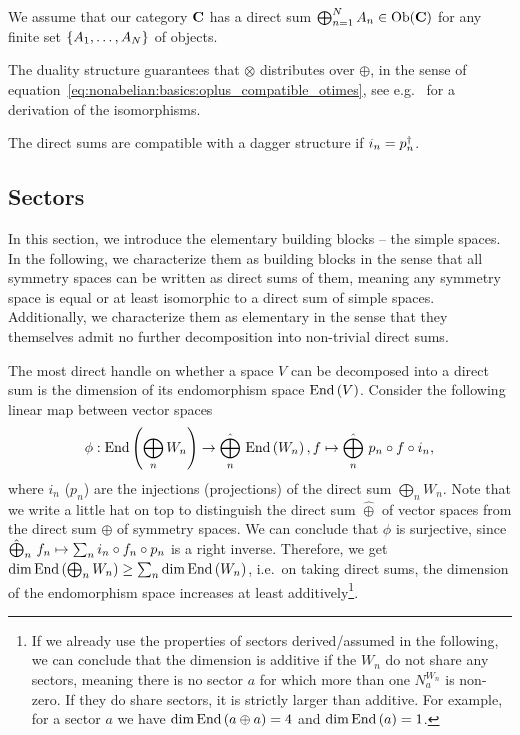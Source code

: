 \begin{doublecol}
    We assume that our category $\mathbf{C}$ has a direct sum $\bigoplus_{n=1}^N A_n \in \mathrm{Ob}(\mathbf{C})$ for any finite set $\set{A_1, \dots, A_N}$ of objects.
    
    The duality structure guarantees that $\otimes$ distributes over $\oplus$, in the sense of equation~\eqref{eq:nonabelian:basics:oplus_compatible_otimes}, see e.g.~\cite[Sec. 3.3]{heunen2019} for a derivation of the isomorphisms.
    
    The direct sums are compatible with a dagger structure if $i_n = p_n^\dagger$.
\end{doublecol}



\subsection{Sectors}
\label{subsec:nonabelian:basics:sectors}
%
In this section, we introduce the elementary building blocks -- the simple spaces.
%
In the following, we characterize them as building blocks in the sense that all symmetry spaces can be written as direct sums of them, meaning any symmetry space is equal or at least isomorphic to a direct sum of simple spaces.
%
Additionally, we characterize them as elementary in the sense that they themselves admit no further decomposition into non-trivial direct sums.

The most direct handle on whether a space $V$ can be decomposed into a direct sum is the dimension of its endomorphism space $\mathrm{End}\left(V\right)$.
%
Consider the following linear map between vector spaces
\begin{equation}
    \phi : \mathrm{End}\left(\bigoplus_n W_n\right) \to \hat{\bigoplus_n}~ \mathrm{End}\left(W_n\right) , f \mapsto \hat{\bigoplus_n}~ p_n \circ f \circ i_n,
\end{equation}
where $i_n$ ($p_n$) are the injections (projections) of the direct sum $\bigoplus_n W_n$.
%
Note that we write a little hat on top to distinguish the direct sum $\hat\oplus$ of vector spaces from the direct sum $\oplus$ of symmetry spaces.
%
We can conclude that $\phi$ is surjective, since $\hat\bigoplus_n~ f_n \mapsto \sum_n i_n \circ f_n \circ p_n$ is a right inverse.
%
Therefore, we get $\dim\mathrm{End}\left(\bigoplus_n W_n\right) \geq \sum_n \dim\mathrm{End}\left(W_n\right)$, i.e.~on taking direct sums, the dimension of the endomorphism space increases at least additively\footnote{
    If we already use the properties of sectors derived/assumed in the following, we can conclude that the dimension is additive if the $W_n$ do not share any sectors, meaning there is no sector $a$ for which more than one $N^{W_n}_a$ is non-zero.
    If they do share sectors, it is strictly larger than additive.
    For example, for a sector $a$ we have $\dim\mathrm{End}\left(a \oplus a\right) = 4$ and $\dim\mathrm{End}\left(a\right) = 1$.
}.

